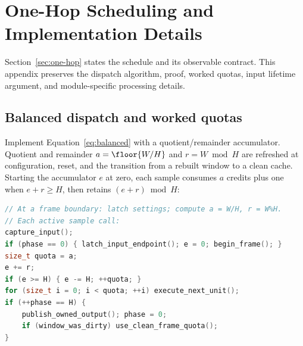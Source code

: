 \section{One-Hop Scheduling and Implementation Details}
\label{app:one-hop}
Section~\ref{sec:one-hop} states the schedule and its observable contract.
This appendix preserves the dispatch algorithm, proof, worked quotas, input
lifetime argument, and module-specific processing details.

\subsection{Balanced dispatch and worked quotas}
Implement Equation~\eqref{eq:balanced} with a quotient/remainder accumulator.
Quotient and
remainder $a=\floor{W/H}$ and $r=W\bmod H$ are refreshed at configuration,
reset, and the transition from a rebuilt window to a clean cache.
Starting the accumulator $e$ at zero, each sample consumes $a$ credits plus one
when $e+r\ge H$, then retains $(e+r)\bmod H$:
\begin{lstlisting}[float=htbp,language=C++,caption={Balanced one-hop dispatch. execute\_next\_unit retains stage and traversal state; output stays private until publication.},label={lst:whole-hop}]
// At a frame boundary: latch settings; compute a = W/H, r = W%H.
// Each active sample call:
capture_input();
if (phase == 0) { latch_input_endpoint(); e = 0; begin_frame(); }
size_t quota = a;
e += r;
if (e >= H) { e -= H; ++quota; }
for (size_t i = 0; i < quota; ++i) execute_next_unit();
if (++phase == H) {
    publish_owned_output(); phase = 0;
    if (window_was_dirty) use_clean_frame_quota();
}
\end{lstlisting}

